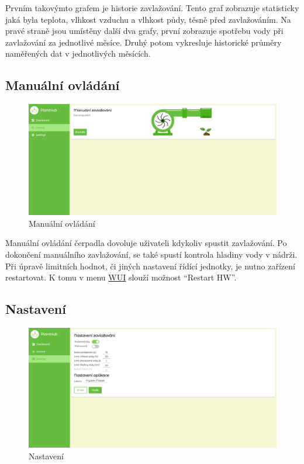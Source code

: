 \documentclass[czech,12pt,a4paper]{article}
\begin{document}
Prvním takovýmto grafem je historie zavlažování. Tento graf zobrazuje statisticky jaká byla teplota, vlhkost vzduchu a vlhkost půdy, těsně před zavlažováním. Na pravé straně jsou umístěny další dva grafy, první zobrazuje spotřebu vody při zavlažování za jednotlivé měsíce. Druhý potom vykresluje historické průměry naměřených dat v jednotlivých měsících.

\clearpage

\subsection{Manuální ovládání}

\begin{figure}[h]
	\centering
	\includegraphics[width=\linewidth]{web-ui-pump.png}
	\caption{Manuální ovládání}
\end{figure}

Manuální ovládání čerpadla dovoluje uživateli kdykoliv spustit zavlažování. Po dokončení manuálního zavlažování, se také spustí kontrola hladiny vody v nádrži. Při úpravě limitních hodnot, či jiných nastavení řídící jednotky, je nutno zařízení restartovat. K tomu v menu \underline{\ac{WUI}} slouží možnost \enquote{Restart HW}.

\clearpage

\subsection{Nastavení}

\begin{figure}[h]
	\centering
	\includegraphics[width=\linewidth]{web-ui-settings.png}
	\caption{Nastavení}
\end{figure}
\end{document}

